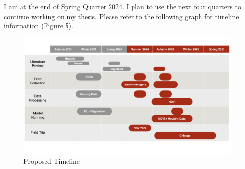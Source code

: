 I am at the end of Spring Quarter 2024. I plan to use the next four quarters to continue working on my thesis. Please refer to the following graph for timeline information (Figure 5).

\begin{figure}[h]
    \centering
    \includegraphics[width=1\textwidth]{Visual/final_timeline.jpeg}
    \caption{Proposed Timeline}
\end{figure}